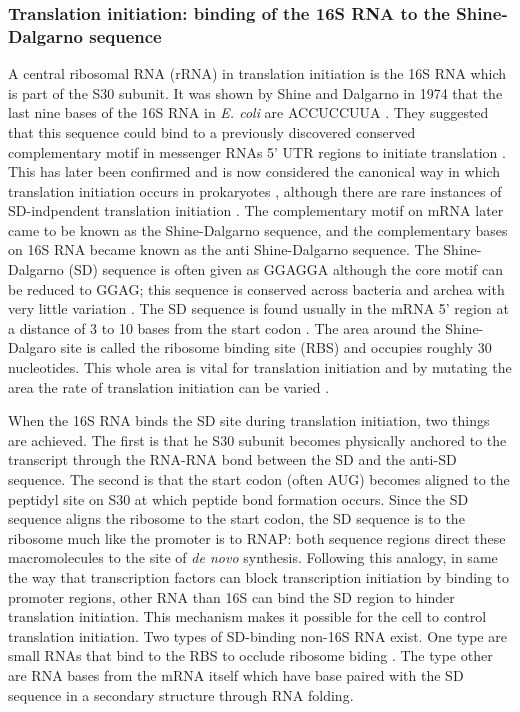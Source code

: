 \subsubsection{Translation initiation: binding of the 16S RNA to the Shine-Dalgarno sequence}
A central ribosomal RNA (rRNA) in translation initiation is the 16S RNA which
is part of the S30 subunit. It was shown by Shine and Dalgarno in 1974 that the
last nine bases of the 16S RNA in \textit{E. coli} are ACCUCCUUA
\cite{shine_3-terminal_1974}. They suggested that this sequence could bind to a
previously discovered conserved complementary motif in messenger RNAs 5' UTR
regions to initiate translation \cite{shine_3-terminal_1974}. This has later
been confirmed and is now considered the canonical way in which translation
initiation occurs in prokaryotes \cite{nakagawa_dynamic_2010}, although there
are rare instances of SD-indpendent translation initiation
\cite{skorski_highly_2006, boni_non-canonical_2001}. The
complementary motif on mRNA later came to be known as the Shine-Dalgarno
sequence, and the complementary bases on 16S RNA became known as the anti
Shine-Dalgarno sequence. The Shine-Dalgarno (SD) sequence is often given as
GGAGGA although the core motif can be reduced to GGAG; this sequence is
conserved across bacteria and archea with very little variation
\cite{nakagawa_dynamic_2010}. The SD sequence is found usually in the mRNA 5'
region at a distance of 3 to 10 bases from the start codon
\cite{chen_determination_1994-1}. The area around the Shine-Dalgaro site is
called the ribosome binding site (RBS) and occupies roughly 30 nucleotides.
This whole area is vital for translation initiation and by mutating the area
the rate of translation initiation can be varied
\cite{shultzaberger_anatomy_2001}.

When the 16S RNA binds the SD site during translation initiation, two things
are achieved. The first is that he S30 subunit becomes physically anchored to
the transcript through the RNA-RNA bond between the SD and the anti-SD
sequence. The second is that the start codon (often AUG) becomes aligned to the
peptidyl site on S30 at which peptide bond formation occurs. Since the SD
sequence aligns the ribosome to the start codon, the SD sequence is to the
ribosome much like the promoter is to RNAP: both sequence regions direct these
macromolecules to the site of \textit{de novo} synthesis. Following this
analogy, in same the way that transcription factors can block transcription
initiation by binding to promoter regions, other RNA than 16S can bind the SD
region to hinder translation initiation. This mechanism makes it possible for
the cell to control translation initiation. Two types of SD-binding non-16S RNA
exist. One type are small RNAs that bind to the RBS to occlude ribosome biding
\cite{storz_controlling_2004}. The type other are RNA bases from the mRNA
itself which have base paired with the SD sequence in a secondary structure
through RNA folding.

